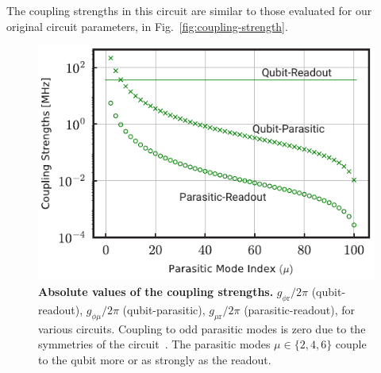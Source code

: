 \documentclass[%
reprint,
superscriptaddress,
 amsmath,amssymb,
 aps,
 prx,
longbibliography,
floatfix,
]{revtex4-2}
\begin{document}
{The coupling strengths in this circuit are similar to those evaluated for our original circuit parameters, in Fig.~\ref{fig:coupling-strength}.
\begin{figure}[htb]
    \centering
    \includegraphics[width=\linewidth]{Supp_Fig/Coupling-Will.pdf}
    \caption{{\bf Absolute values of the coupling strengths.} $g_{\phi \textrm{r}}/2\pi$ (qubit-readout), $g_{\phi\mu}/2\pi$ (qubit-parasitic), $g_{\mu \textrm{r}}/2\pi$ (parasitic-readout), for various circuits. Coupling to odd parasitic modes is zero due to the symmetries of the circuit~\cite{viola2015collective}. The parasitic modes $\mu\in\{2,4,6\}$ couple to the qubit more or as strongly as the readout.}
    \label{fig:coupling-strength-Will}
\end{figure}

}
\end{document}
